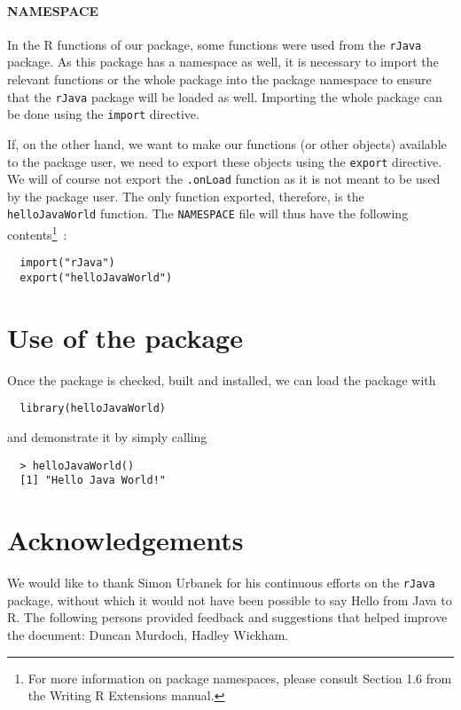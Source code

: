 \documentclass[a4paper, 11pt]{article}
\begin{document}
\paragraph{NAMESPACE}

In the R functions of our package, some functions were used from the
\texttt{rJava} package. As this package has a namespace as well, it
is necessary to import the relevant functions or the whole package into
the package namespace to ensure that the \texttt{rJava} package will be 
loaded as well. Importing the whole package can be done using the 
\texttt{import} directive. 

If, on the other hand, we want to make our functions (or other objects)
available to the package user, we need to export these objects using the
\texttt{export} directive. We will of course not export the \verb|.onLoad| 
function as it is not meant to be used by the package user. The
only function exported, therefore, is the \texttt{helloJavaWorld}
function. The \texttt{NAMESPACE} file will thus have the 
following contents\footnote{For more information on package namespaces, 
please consult Section 1.6 from the Writing R Extensions manual.}~:

\begin{verbatim}
  import("rJava")
  export("helloJavaWorld")
\end{verbatim}

\section{Use of the package}

Once the package is checked, built and installed, we
can load the package with
\begin{verbatim}
  library(helloJavaWorld)
\end{verbatim}

and demonstrate it by simply calling
\begin{verbatim}
  > helloJavaWorld()
  [1] "Hello Java World!"
\end{verbatim}

\section{Acknowledgements}

We would like to thank Simon Urbanek for his continuous efforts
on the \texttt{rJava} package, without which it would not have
been possible to say Hello from Java to R. The following persons
provided feedback and suggestions that helped improve the
document: Duncan Murdoch, Hadley Wickham.
\end{document}
